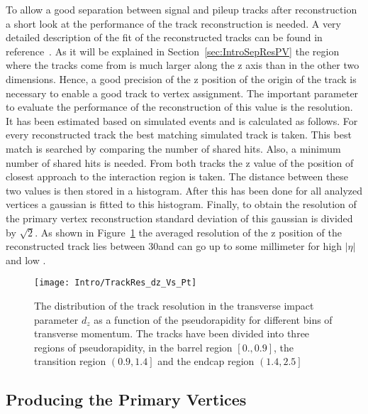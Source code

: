 To allow a good separation between signal and pileup tracks after reconstruction a short look at the performance of the track reconstruction is needed. A very detailed description of the fit of the reconstructed tracks can be found in reference~. As it will be explained in Section~\ref{sec:IntroSepResPV} the region where the tracks come from is much larger along the z axis than in the other two dimensions. Hence, a good precision of the z position of the origin of the track is necessary to enable a good track to vertex assignment. The important parameter to evaluate the performance of the reconstruction of this value is the resolution. It has been estimated based on simulated events and is calculated as follows. For every reconstructed track the best matching simulated track is taken. This best match is searched by comparing the number of shared hits. Also, a minimum number of shared hits is needed. From both tracks the z value of the position of closest approach to the interaction region is taken. The distance between these two values is then stored in a histogram. After this has been done for all analyzed vertices a gaussian is fitted to this histogram. Finally, to obtain the resolution of the primary vertex reconstruction standard deviation of this gaussian is divided by $\sqrt{2}$.  As shown in Figure~\ref{plot:IntroTrackRes} the averaged resolution of the z position of the reconstructed track lies between 30\mum and can go up to some millimeter for high $\left|\eta\right|$ and low \pt. 

\begin{figure}[!Hhtb]
  \centering
  \texttt{[image: Intro/TrackRes\_dz\_Vs\_Pt]}
  \caption[Track resolution \vs pseudo rapidity for different bins of transverse momentum]{The distribution of the track resolution in the transverse impact parameter $d_{z}$ as a function of the pseudorapidity for different bins of transverse momentum. The tracks have been divided into three regions of pseudorapidity, in the barrel region $\left[0., 0.9\right]$, the transition region $\left(0.9, 1.4\right]$ and the endcap region $\left(1.4, 2.5\right]$\label{plot:IntroTrackRes}}
\end{figure}

\subsection{Producing the Primary Vertices\label{sec:IntroProdPV}}

